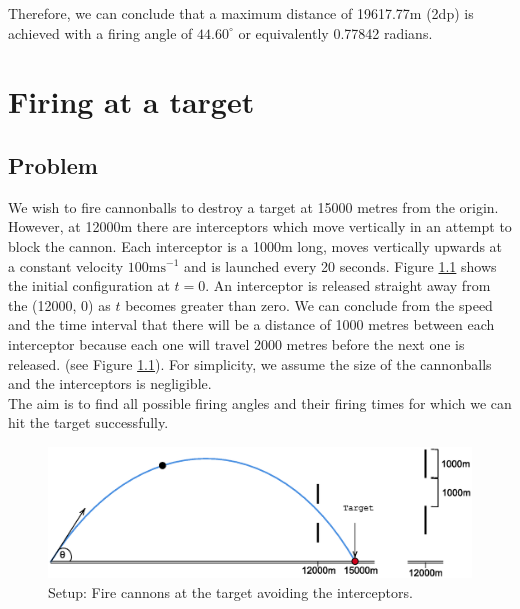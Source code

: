 \documentclass[11pt]{report}
\begin{document}
Therefore, we can conclude that a maximum distance of 19617.77m (2dp) is achieved with a firing angle of $44.60^{\circ}$ or equivalently 0.77842 radians. %



\chapter{Firing at a target}
\section*{Problem}
We wish to fire cannonballs to destroy a target at 15000 metres from the origin. However, at 12000m there are interceptors which move vertically in an attempt to block the cannon. Each interceptor is a 1000m long, moves vertically upwards at a constant velocity $100\text{ms}^{-1}$ and is launched every 20 seconds. Figure \ref{fig:target} shows the initial configuration at $t=0$. An interceptor is released straight away from the (12000, 0) as $t$ becomes greater than zero. We can conclude from the speed and the time interval that there will be a distance of 1000 metres between each interceptor because each one will travel 2000 metres before the next one is released. (see Figure \ref{fig:target}). For simplicity, we assume the size of the cannonballs and the interceptors is negligible.\\

The aim is to find all possible firing angles and their firing times for which we can hit the target successfully.
\begin{figure}[h]
	\centering
  	\includegraphics[scale=0.75]{assets/target.eps}
  	\caption{Setup: Fire cannons at the target avoiding the interceptors.}
  	\label{fig:target}
\end{figure}
\end{document}
